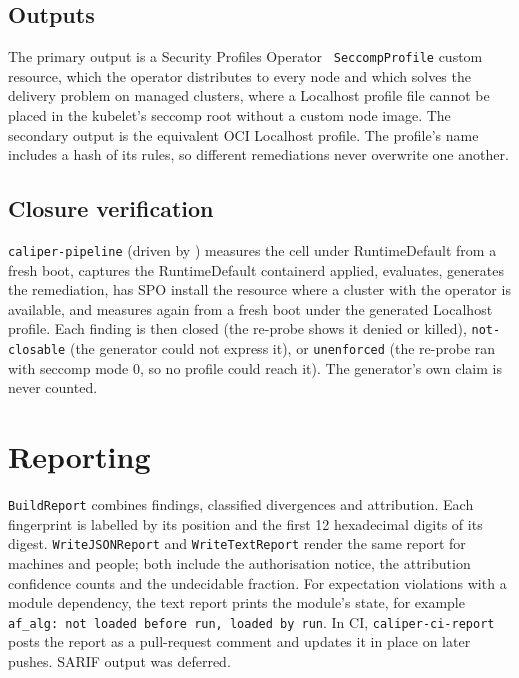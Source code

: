 \subsection{Outputs}
The primary output is a Security Profiles Operator~\cite{spo} \texttt{SeccompProfile} custom resource, which the operator distributes to every node and which solves the delivery problem on managed clusters, where a Localhost profile file cannot be placed in the kubelet's seccomp root without a custom node image. The secondary output is the equivalent OCI Localhost profile. The profile's name includes a hash of its rules, so different remediations never overwrite one another.

\subsection{Closure verification}
\texttt{caliper-pipeline} (driven by ) measures the cell under RuntimeDefault from a fresh boot, captures the RuntimeDefault containerd applied, evaluates, generates the remediation, has SPO install the resource where a cluster with the operator is available, and measures again from a fresh boot under the generated Localhost profile. Each finding is then closed (the re-probe shows it denied or killed), \texttt{not-closable} (the generator could not express it), or \texttt{unenforced} (the re-probe ran with seccomp mode 0, so no profile could reach it). The generator's own claim is never counted.

\section{Reporting}

\texttt{BuildReport} combines findings, classified divergences and attribution. Each fingerprint is labelled by its position and the first 12 hexadecimal digits of its digest. \texttt{WriteJSONReport} and \texttt{WriteTextReport} render the same report for machines and people; both include the authorisation notice, the attribution confidence counts and the undecidable fraction. For expectation violations with a module dependency, the text report prints the module's state, for example \texttt{af\_alg: not loaded before run, loaded by run}. In CI, \texttt{caliper-ci-report} posts the report as a pull-request comment and updates it in place on later pushes. SARIF output was deferred.

